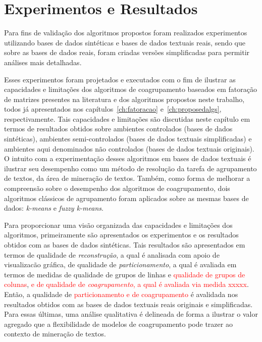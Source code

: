 \documentclass[
    12pt,                %
    oneside,            %
    a4paper,            %
    english,            %
    brazil                %
    ]{abntex2ppgsi}
\begin{document}
\chapter{Experimentos e Resultados}
\label{ch:experiments}


Para fins de validação dos algoritmos propostos foram realizados experimentos utilizando bases de dados sintéticas e bases de dados textuais reais, sendo que sobre as bases de dados reais, foram criadas versões simplificadas para permitir análises mais detalhadas.

Esses experimentos foram projetados e executados com o fim de ilustrar as capacidades e limitações dos algoritmos de coagrupamento baseados em fatoração de matrizes presentes na literatura e dos algoritmos propostos neste trabalho, todos já apresentados nos capítulos~\ref{ch:fatoracao} e~\ref{ch:proposedalgs}, respectivamente. Tais capacidades e limitações são discutidas neste capítulo em termos de resultados obtidos sobre ambientes controlados (bases de dados sintéticas), ambientes semi-controlados (bases de dados textuais simplificadas) e ambientes aqui denominados não controlados (bases de dados textuais originais). O intuito com a experimentação desses algoritmos em bases de dados textuais é ilustrar seu desempenho como um método de resolução da tarefa de agrupamento de textos, da área de mineração de textos. Também, como forma de melhorar a compreensão sobre o desempenho dos algoritmos de coagrupamento, dois algoritmos clássicos de agrupamento foram aplicados sobre as mesmas bases de dados: \textit{k-means} e \textit{fuzzy k-means}.


Para proporcionar uma visão organizada das capacidades e limitações dos algoritmos, primeiramente são apresentados os experimentos e os resultados obtidos com as bases de dados sintéticas. Tais resultados são apresentados em termos de qualidade de \textit{reconstrução}, a qual é analisada com apoio de visualizacão gráfica, de qualidade de \textit{particionamento}, a qual é avaliada em termos de medidas de qualidade de grupos de linhas e \textcolor{red}{qualidade de grupos de colunas}, \textcolor{red}{e de qualidade de \textit{coagrupamento}, a qual é avaliada via medida xxxxx}. Então, a qualidade de \textcolor{red}{particionamento e de coagrupamento} é avalidada nos resultados obtidos com as bases de dados textuais reais originais e simplificadas. Para essas últimas, uma análise qualitativa é delineada de forma a ilustrar o valor agregado que a flexibilidade de modelos de coagrupamento pode trazer ao contexto de mineração de textos.
\end{document}
